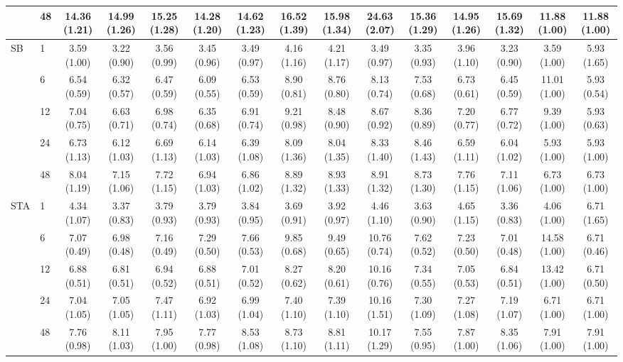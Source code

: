 \begin{table}[H]
{\begin{tabular}{llccccccccccccc}
 & 48 & 14.36 (1.21) & 14.99 (1.26) & 15.25 (1.28) & 14.28 (1.20) & 14.62 (1.23) & 16.52 (1.39) & 15.98 (1.34) & 24.63 (2.07) & 15.36 (1.29) & 14.95 (1.26) & 15.69 (1.32) & 11.88 (1.00) & 11.88 (1.00) \\
\midrule
SB & 1 & 3.59 (1.00) & 3.22 (0.90) & 3.56 (0.99) & 3.45 (0.96) & 3.49 (0.97) & 4.16 (1.16) & 4.21 (1.17) & 3.49 (0.97) & 3.35 (0.93) & 3.96 (1.10) & 3.23 (0.90) & 3.59 (1.00) & 5.93 (1.65) \\
 & 6 & 6.54 (0.59) & 6.32 (0.57) & 6.47 (0.59) & 6.09 (0.55) & 6.53 (0.59) & 8.90 (0.81) & 8.76 (0.80) & 8.13 (0.74) & 7.53 (0.68) & 6.73 (0.61) & 6.45 (0.59) & 11.01 (1.00) & 5.93 (0.54) \\
 & 12 & 7.04 (0.75) & 6.63 (0.71) & 6.98 (0.74) & 6.35 (0.68) & 6.91 (0.74) & 9.21 (0.98) & 8.48 (0.90) & 8.67 (0.92) & 8.36 (0.89) & 7.20 (0.77) & 6.77 (0.72) & 9.39 (1.00) & 5.93 (0.63) \\
 & 24 & 6.73 (1.13) & 6.12 (1.03) & 6.69 (1.13) & 6.14 (1.03) & 6.39 (1.08) & 8.09 (1.36) & 8.04 (1.35) & 8.33 (1.40) & 8.46 (1.43) & 6.59 (1.11) & 6.04 (1.02) & 5.93 (1.00) & 5.93 (1.00) \\
 & 48 & 8.04 (1.19) & 7.15 (1.06) & 7.72 (1.15) & 6.94 (1.03) & 6.86 (1.02) & 8.89 (1.32) & 8.93 (1.33) & 8.91 (1.32) & 8.73 (1.30) & 7.76 (1.15) & 7.11 (1.06) & 6.73 (1.00) & 6.73 (1.00) \\
\midrule
STA & 1 & 4.34 (1.07) & 3.37 (0.83) & 3.79 (0.93) & 3.79 (0.93) & 3.84 (0.95) & 3.69 (0.91) & 3.92 (0.97) & 4.46 (1.10) & 3.63 (0.90) & 4.65 (1.15) & 3.36 (0.83) & 4.06 (1.00) & 6.71 (1.65) \\
 & 6 & 7.07 (0.49) & 6.98 (0.48) & 7.16 (0.49) & 7.29 (0.50) & 7.66 (0.53) & 9.85 (0.68) & 9.49 (0.65) & 10.76 (0.74) & 7.62 (0.52) & 7.23 (0.50) & 7.01 (0.48) & 14.58 (1.00) & 6.71 (0.46) \\
 & 12 & 6.88 (0.51) & 6.81 (0.51) & 6.94 (0.52) & 6.88 (0.51) & 7.01 (0.52) & 8.27 (0.62) & 8.20 (0.61) & 10.16 (0.76) & 7.34 (0.55) & 7.05 (0.53) & 6.84 (0.51) & 13.42 (1.00) & 6.71 (0.50) \\
 & 24 & 7.04 (1.05) & 7.05 (1.05) & 7.47 (1.11) & 6.92 (1.03) & 6.99 (1.04) & 7.40 (1.10) & 7.39 (1.10) & 10.16 (1.51) & 7.30 (1.09) & 7.27 (1.08) & 7.19 (1.07) & 6.71 (1.00) & 6.71 (1.00) \\
 & 48 & 7.76 (0.98) & 8.11 (1.03) & 7.95 (1.00) & 7.77 (0.98) & 8.53 (1.08) & 8.73 (1.10) & 8.81 (1.11) & 10.17 (1.29) & 7.55 (0.95) & 7.87 (1.00) & 8.35 (1.06) & 7.91 (1.00) & 7.91 (1.00) \\
\bottomrule
\end{tabular}}
\end{table}
